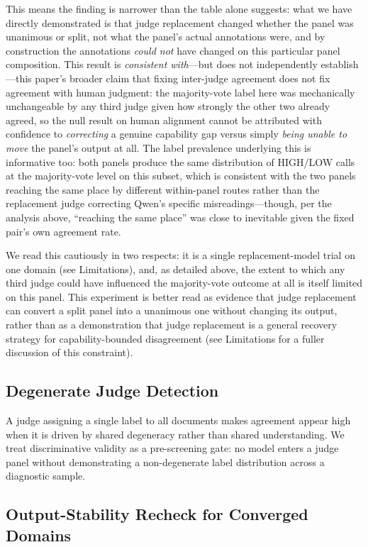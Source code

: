 \documentclass[11pt]{article}
\begin{document}
This means the finding is narrower than the table alone suggests: what we
have directly demonstrated is that judge replacement changed whether the
panel was unanimous or split, not what the panel's actual annotations
were, and by construction the annotations \emph{could not} have changed on
this particular panel composition. This result is \emph{consistent
with}---but does not independently establish---this paper's broader claim
that fixing inter-judge agreement does not fix agreement with human
judgment: the majority-vote label here was mechanically unchangeable by
any third judge given how strongly the other two already agreed, so the
null result on human alignment cannot be attributed with confidence to
\emph{correcting} a genuine capability gap versus simply \emph{being
unable to move} the panel's output at all. The label prevalence underlying
this is informative too: both panels produce the same distribution of
HIGH/LOW calls at the majority-vote level on this subset, which is
consistent with the two panels reaching the same place by different
within-panel routes rather than the replacement judge correcting Qwen's
specific misreadings---though, per the analysis above, ``reaching the same
place'' was close to inevitable given the fixed pair's own agreement rate.

We read this cautiously in two respects: it is a single replacement-model
trial on one domain (see Limitations), and, as detailed above, the extent
to which any third judge could have influenced the majority-vote outcome
at all is itself limited on this panel. This experiment is better read as
evidence that judge replacement can convert a split panel into a unanimous
one without changing its output, rather than as a demonstration that judge
replacement is a general recovery strategy for capability-bounded
disagreement (see Limitations for a fuller discussion of this
constraint).

\subsection{Degenerate Judge Detection}

A judge assigning a single label to all documents makes agreement appear high
when it is driven by shared degeneracy rather than shared understanding.
We treat discriminative validity as a pre-screening gate: no model enters
a judge panel without demonstrating a non-degenerate label distribution across
a diagnostic sample.

\subsection{Output-Stability Recheck for Converged Domains}
\label{sec:regressioncheck}
\end{document}
